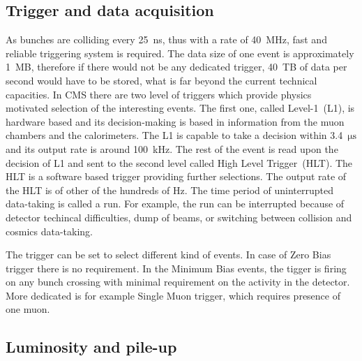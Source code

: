 
\subsection{Trigger and data acquisition}

As bunches are colliding every 25~ns, thus with a rate of 40~MHz, fast and reliable triggering system is required. The data size of one event is approximately 1~MB, therefore if there would not be any dedicated trigger, 40~TB of data per second would have to be stored, what is far beyond the current technical capacities. In CMS there are two level of triggers which provide physics motivated selection of the interesting events. The first one, called Level-1~(L1), is hardware based and its decision-making is based in information from the muon chambers and the calorimeters. The L1 is capable to take a decision within 3.4~$\mathrm{\mu s}$ and its output rate is around 100~kHz. The rest of the event is read upon the decision of L1 and sent to the second level called High Level Trigger~(HLT). The HLT is a software based trigger providing further selections. The output rate of the HLT is of other of the hundreds of Hz. The time period of uninterrupted data-taking is called a run. For example, the run can be interrupted because of detector techincal difficulties, dump of beams, or switching between collision and cosmics data-taking.

The trigger can be set to select different kind of events. In case of Zero Bias trigger there is no requirement. In the Minimum Bias events, the tigger is firing on any bunch crossing with minimal requirement on the activity in the detector. More dedicated is for example Single Muon trigger, which requires presence of one muon. 

\subsection{Luminosity and pile-up}

